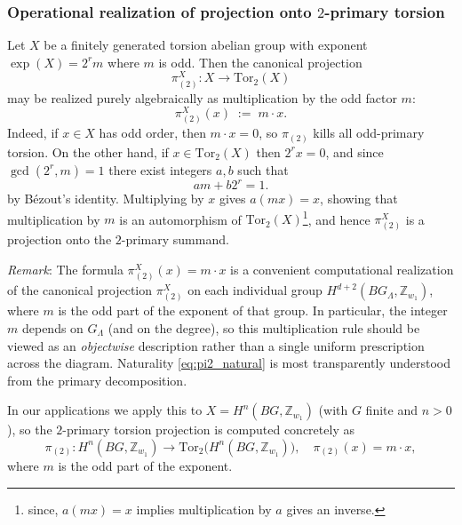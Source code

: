 \documentclass[aps,prx,reprint,superscriptaddress,twocolumn,amsmath,amssymb,amsfonts, nofootinbib]{revtex4-2}
\newcommand{\tor}{\text{Tor}}
\newcommand{\Z}{\mathbb{Z}}
\theoremstyle{apsstyle}
\begin{document}
\subsubsection{Operational realization of projection onto $2$-primary torsion}
\label{app:op_def_proj}

Let $X$ be a finitely generated torsion abelian group with exponent $\exp(X)=2^r m$ where $m$ is odd. Then the canonical projection
\begin{equation}
    \pi^{X}_{(2)}:X \longrightarrow \tor_2(X)
\end{equation}
may be realized purely algebraically as multiplication by the odd factor $m$:
\begin{equation}
\label{eq:pi2_mult}
    \pi^{X}_{(2)}(x)\;:=\;m\cdot x.
\end{equation}
Indeed, if $x\in X$ has odd order, then $m\cdot x=0$, so $\pi_{(2)}$ kills all odd-primary torsion. On the other hand, if $x\in \tor_2(X)$ then $2^r x=0$, and since $\gcd(2^r,m)=1$ there exist integers $a,b$ such that
\begin{equation}
    a m + b 2^r = 1.
\end{equation}
by Bézout’s identity. Multiplying by $x$ gives $a(m x)=x$, showing that multiplication by $m$ is an automorphism of $\tor_2(X)$\footnote{since, $a(mx)=x$ implies multiplication by $a$ gives an inverse.}, and hence $\pi^{X}_{(2)}$ is a projection onto the $2$-primary summand.

\bigskip 

\noindent \textit{Remark}: The formula $\pi^{X}_{(2)}(x)=m\cdot x$ is a convenient computational realization of the canonical projection $\pi^{X}_{(2)}$ on each individual group $H^{d+2}(BG_{\Lambda}, \Z_{w_{1}})$, where $m$ is the odd part of the exponent of that group. In particular, the integer $m$ depends on $G_{\Lambda}$ (and on the degree), so this multiplication rule should be viewed as an \emph{objectwise} description rather than a single uniform prescription across the diagram. Naturality \eqref{eq:pi2_natural} is most transparently understood from the primary decomposition.

\bigskip 

In our applications we apply this to $X=H^{n}(BG,\mathbb{Z}_{w_1})$ (with $G$ finite and $n>0$),
so the $2$-primary torsion projection is computed concretely as
\begin{equation}
    \pi_{(2)}:H^{n}(BG,\mathbb{Z}_{w_1})
    \rightarrow
    \tor_2\big(H^{n}(BG,\mathbb{Z}_{w_1})\big),
    \quad
    \pi_{(2)}(x)=m\cdot x,
\end{equation}
where $m$ is the odd part of the exponent.
\end{document}

